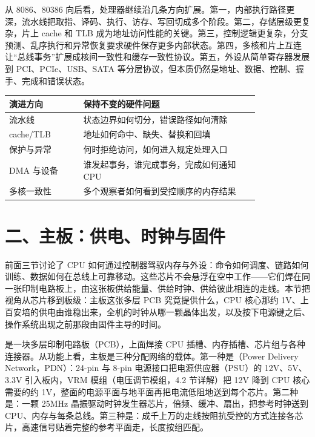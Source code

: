 从 8086、80386 向后看，处理器继续沿几条方向扩展。第一，内部执行路径更深，流水线把取指、译码、执行、访存、写回切成多个阶段。第二，存储层级更复杂，片上 cache 和 TLB 成为地址访问性能的关键。第三，控制逻辑更复杂，分支预测、乱序执行和异常恢复要求硬件保存更多内部状态。第四，多核和片上互连让“总线事务”扩展成核间一致性和缓存一致性协议。第五，外设从简单寄存器发展到 PCI、PCIe、USB、SATA 等分层协议，但本质仍然是地址、数据、控制、握手、完成和错误状态。

\begin{longtable}{L{0.24\linewidth}L{0.58\linewidth}}
\toprule
演进方向 & 保持不变的硬件问题 \\
\midrule
流水线 & 状态边界如何切分，错误路径如何清除 \\\tablerowrule
cache/TLB & 地址如何命中、缺失、替换和回填 \\\tablerowrule
保护与异常 & 何时拒绝访问，如何进入规定处理入口 \\\tablerowrule
DMA 与设备 & 谁发起事务，谁完成事务，完成如何通知 CPU \\\tablerowrule
多核一致性 & 多个观察者如何看到受控顺序的内存结果 \\
\bottomrule
\end{longtable}

\section{二、主板：供电、时钟与固件}

前面三节讨论了 CPU 如何通过控制器驾驭内存与外设：命令如何调度、链路如何训练、数据如何在总线上可靠移动。这些芯片不会悬浮在空中工作——它们焊在同一张印制电路板上，由这张板供给能量、供给时钟、供给彼此相连的走线。本节把视角从芯片移到板级：主板这张多层 PCB 究竟提供什么，CPU 核心那约 1V、上百安培的供电由谁稳出来，全机的时钟从哪一颗晶体出发，以及按下电源键之后、操作系统出现之前那段由固件主导的时间。


是一块多层印制电路板（PCB），上面焊接 CPU 插槽、内存插槽、芯片组与各种连接器。从功能上看，主板是三种分配网络的载体。第一种是（Power Delivery Network，PDN）：24-pin 与 8-pin 电源接口把电源供应器（PSU）的 12V、5V、3.3V 引入板内，VRM 模组（电压调节模组，4.2 节详解）把 12V 降到 CPU 核心需要的约 1V，整面的电源平面与地平面再把电流低阻地送到每个芯片。第二种是：一颗 25MHz 晶振驱动时钟发生器芯片，倍频、缓冲、扇出，把参考时钟送到 CPU、内存与每条总线。第三种是：成千上万的走线按阻抗受控的方式连接各芯片，高速信号贴着完整的参考平面走，长度按组匹配。

